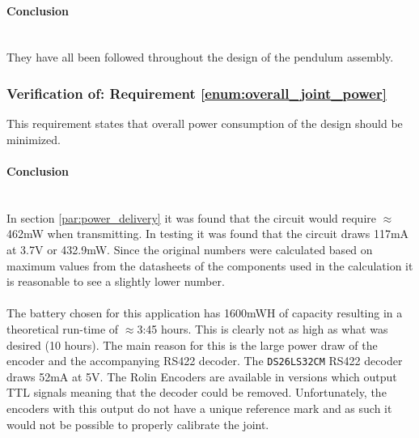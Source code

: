 \paragraph{Conclusion}~\\
They have all been followed throughout the design of the pendulum assembly.

\subsubsection{Verification of: Requirement \ref{enum:overall_joint_power}} %
\label{ssub:verification_of_requirement_enum:overall_joint_power}
This requirement states that overall power consumption of the design should be minimized.

\paragraph{Conclusion}~\\
In section \ref{par:power_delivery} it was found that the circuit would require $\approx$462mW when transmitting.
In testing it was found that the circuit draws 117mA at 3.7V or 432.9mW.
Since the original numbers were calculated based on maximum values from the datasheets of the components used in the calculation it is reasonable to see a slightly lower number.
\\~\\
The battery chosen for this application has 1600mWH of capacity resulting in a theoretical run-time of $\approx$3:45 hours.
This is clearly not as high as what was desired (10 hours).
The main reason for this is the large power draw of the encoder and the accompanying RS422 decoder.
The \texttt{DS26LS32CM} RS422 decoder draws 52mA at 5V.
The Rolin Encoders are available in versions which output TTL signals meaning that the decoder could be removed. 
Unfortunately, the encoders with this output do not have a unique reference mark and as such it would not be possible to properly calibrate the joint.